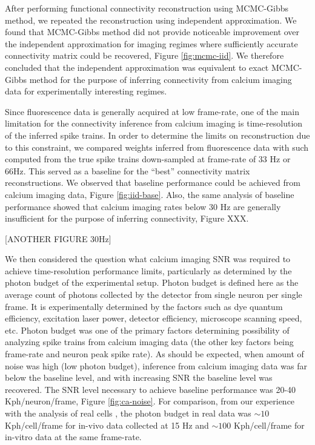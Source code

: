 After performing functional connectivity reconstruction using MCMC-Gibbs method, we repeated the reconstruction using independent approximation. We found that MCMC-Gibbs method did not provide noticeable improvement over the independent approximation for imaging regimes where sufficiently accurate connectivity matrix could be recovered, Figure \ref{fig:mcmc-iid}. We therefore concluded that the independent approximation was equivalent to exact MCMC-Gibbs method for the purpose of inferring connectivity from calcium imaging data for experimentally interesting regimes.

Since fluorescence data is generally acquired at low frame-rate, one of the main limitation for the connectivity inference from calcium imaging is time-resolution of the inferred spike trains. In order to determine the limits on reconstruction due to this constraint, we compared weights inferred from fluorescence data with such computed from the true spike trains down-sampled at frame-rate of 33 Hz or 66Hz. This served as a baseline for the ``best'' connectivity matrix reconstructions. We observed that baseline performance could be achieved from calcium imaging data, Figure \ref{fig:iid-base}.  Also, the same analysis of baseline performance showed that calcium imaging rates below 30 Hz are generally insufficient for the purpose of inferring connectivity, Figure XXX.


[ANOTHER FIGURE 30Hz]

We then considered the question what calcium imaging SNR was required to achieve time-resolution performance limits, particularly as determined by the photon budget of the experimental setup. Photon budget is defined here as the average count of photons collected by the detector from single neuron per single frame. It is experimentally determined by the factors such as dye quantum efficiency, excitation laser power, detector efficiency, microscope scanning speed, etc. Photon budget was one of the primary factors determining possibility of analyzing spike trains from calcium imaging data (the other key factors being frame-rate and neuron peak spike rate).  As should be expected, when amount of noise was high (low photon budget), inference from calcium imaging data was far below the baseline level, and with increasing SNR the baseline level was recovered. The SNR level necessary to achieve baseline performance was 20-40 Kph/neuron/frame, Figure \ref{fig:ca-noise}.  For comparison, from our experience with the analysis of real cells \cite{Vogelstein2009}, the photon budget in real data was $\sim 10$ Kph/cell/frame for in-vivo data collected at 15  Hz and $\sim 100$ Kph/cell/frame for in-vitro data at the same frame-rate.

